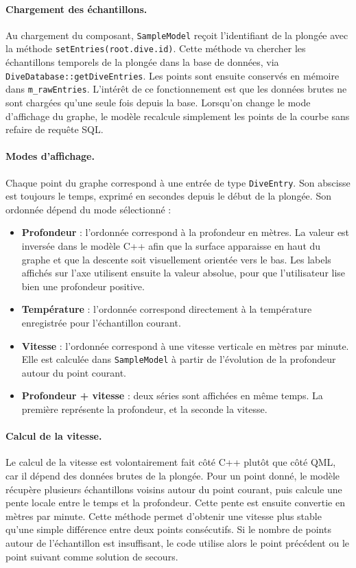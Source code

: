 \documentclass{article}
\begin{document}
\paragraph{Chargement des échantillons.}
Au chargement du composant, \texttt{SampleModel} reçoit l'identifiant de la
plongée avec la méthode \texttt{setEntries(root.dive.id)}. Cette méthode va
chercher les échantillons temporels de la plongée dans la base de données, via
\texttt{DiveDatabase::getDiveEntries}. Les points sont ensuite conservés en
mémoire dans \texttt{m\_rawEntries}. L'intérêt de ce fonctionnement est que les
données brutes ne sont chargées qu'une seule fois depuis la base. Lorsqu'on
change le mode d'affichage du graphe, le modèle recalcule simplement les points
de la courbe sans refaire de requête SQL.

\paragraph{Modes d'affichage.}
Chaque point du graphe correspond à une entrée de type \texttt{DiveEntry}. Son
abscisse est toujours le temps, exprimé en secondes depuis le début de la
plongée. Son ordonnée dépend du mode sélectionné :
\begin{itemize}
    \item \textbf{Profondeur} : l'ordonnée correspond à la profondeur en mètres.
    La valeur est inversée dans le modèle C++ afin que la surface apparaisse en
    haut du graphe et que la descente soit visuellement orientée vers le bas.
    Les labels affichés sur l'axe utilisent ensuite la valeur absolue, pour que
    l'utilisateur lise bien une profondeur positive.
    \item \textbf{Température} : l'ordonnée correspond directement à la
    température enregistrée pour l'échantillon courant.
    \item \textbf{Vitesse} : l'ordonnée correspond à une vitesse verticale en
    mètres par minute. Elle est calculée dans \texttt{SampleModel} à partir de
    l'évolution de la profondeur autour du point courant.
    \item \textbf{Profondeur + vitesse} : deux séries sont affichées en même
    temps. La première représente la profondeur, et la seconde la vitesse.
\end{itemize}

\paragraph{Calcul de la vitesse.}
Le calcul de la vitesse est volontairement fait côté C++ plutôt que côté QML,
car il dépend des données brutes de la plongée. Pour un point donné, le modèle
récupère plusieurs échantillons voisins autour du point courant, puis calcule une
pente locale entre le temps et la profondeur. Cette pente est ensuite convertie
en mètres par minute. Cette méthode permet d'obtenir une vitesse plus stable
qu'une simple différence entre deux points consécutifs. Si le nombre de points
autour de l'échantillon est insuffisant, le code utilise alors le point précédent
ou le point suivant comme solution de secours.
\end{document}
